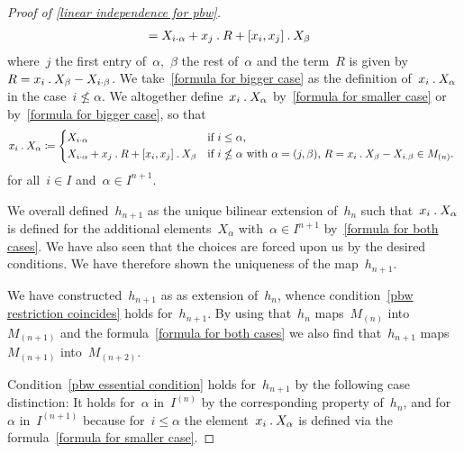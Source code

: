 \begin{proof}[Proof of \cref{linear independence for pbw}]
\begin{align}
		&=
		X_{i \cdot \alpha} + x_j \mathbin{.} R + [x_i, x_j] \mathbin{.} X_\beta
		\label{formula for bigger case}
	\end{align}
	where~$j$ the first entry of~$\alpha$,~$\beta$ the rest of~$\alpha$ and the term~$R$ is given by~$R = x_i \mathbin{.} X_\beta - X_{i \cdot \beta}$.
	We take~\eqref{formula for bigger case} as the definition of~$x_i \mathbin{.} X_\alpha$ in the case~$i \nleq \alpha$.
	We altogether define~$x_i \mathbin{.} X_\alpha$ by~\eqref{formula for smaller case} or by~\eqref{formula for bigger case}, so that
	\begin{equation}
		\label{formula for both cases}
		x_i \act X_\alpha
		\defined
		\begin{cases*}
			X_{i \cdot \alpha}
			&
			if~$i \leq \alpha$,
			\\
			X_{i \cdot \alpha} + x_j \act R + [x_i, x_j] \act X_\beta
			&
			if~$i \nleq \alpha$ with~$\alpha = (j, \beta)$,~$R = x_i \act X_\beta - X_{i \act \beta} \in M_{(n)}$.
		\end{cases*}
	\end{equation}
	for all~$i \in I$ and~$\alpha \in I^{n+1}$.
	
	We overall defined~$h_{n+1}$ as the unique bilinear extension of~$h_n$ such that~$x_i \mathbin{.} X_\alpha$ is defined for the additional elements~$X_\alpha$ with~$\alpha \in I^{n+1}$ by~\eqref{formula for both cases}.
	We have also seen that the choices are forced upon us by the desired conditions.
	We have therefore shown the uniqueness of the map~$h_{n+1}$.

	We have constructed~$h_{n+1}$ as as extension of~$h_n$, whence condition~\ref{pbw restriction coincides} holds for~$h_{n+1}$.
	By using that~$h_n$ maps~$M_{(n)}$ into~$M_{(n+1)}$ and the formula~\eqref{formula for both cases} we also find that~$h_{n+1}$ maps~$M_{(n+1)}$ into~$M_{(n+2)}$.

	Condition~\ref{pbw essential condition} holds for~$h_{n+1}$ by the following case distinction:
	It holds for~$\alpha$ in~$I^{(n)}$ by the corresponding property of~$h_n$, and for~$\alpha$ in~$I^{(n+1)}$ because for~$i \leq \alpha$ the element~$x_i \mathbin{.} X_\alpha$ is defined via the formula~\eqref{formula for smaller case}.


\end{proof}
